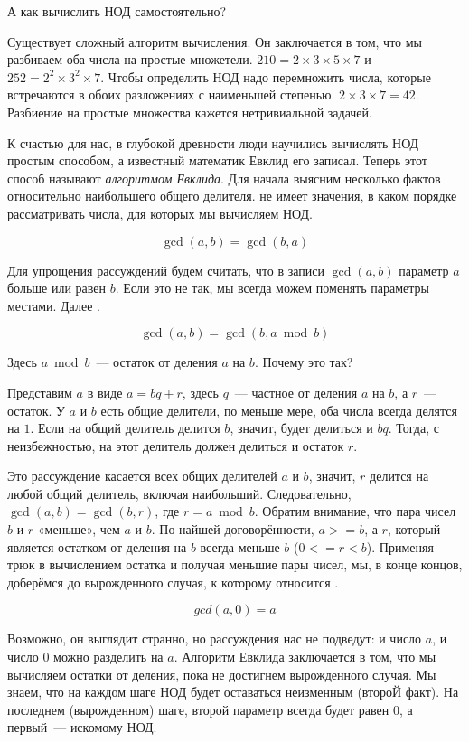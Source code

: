 А как вычислить НОД самостоятельно?

Существует сложный алгоритм вычисления.
Он заключается в том, что мы разбиваем оба числа на простые множетели.
$210 = 2 \times 3 \times 5 \times 7$ и $252 = 2^2 \times 3^2 \times 7$.
Чтобы определить НОД надо перемножить числа, которые встречаются в обоих разложениях с наименьшей степенью.
$2 \times 3 \times 7 = 42$.
Разбиение на простые множества кажется нетривиальной задачей.

К счастью для нас, в глубокой древности люди научились вычислять НОД простым способом, а известный математик Евклид его записал.
Теперь этот способ называют {\em алгоритмом Евклида}.
Для начала выясним несколько фактов относительно наибольшего общего делителя.
 не имеет значения, в каком порядке рассматривать числа, для которых мы вычисляем НОД.

$$
\gcd(a, b) = \gcd(b, a)
$$

Для упрощения рассуждений будем считать, что в записи $\gcd(a, b)$ параметр $a$ больше или равен $b$.
Если это не так, мы всегда можем поменять параметры местами.
Далее .

$$
\gcd(a, b) = \gcd(b, a \bmod b)
$$

Здесь $a \bmod b$~--- остаток от деления $a$ на $b$.
Почему это так?

Представим $a$ в виде $a = b q + r$, здесь $q$~--- частное от деления $a$ на $b$, а $r$~--- остаток.
У $a$ и $b$ есть общие делители, по меньше мере, оба числа всегда делятся на $1$.
Если на общий делитель делится $b$, значит, будет делиться и $b q$.
Тогда, с неизбежностью, на этот делитель должен делиться и остаток $r$.

Это рассуждение касается всех общих делителей $a$ и $b$, значит, $r$ делится на любой общий делитель, включая наибольший.
Следовательно, $\gcd(a, b) = \gcd(b, r)$, где $r = a \bmod b$.
Обратим внимание, что пара чисел $b$ и $r$ «меньше», чем $a$ и $b$.
По найшей договорённости, $a >= b$, а $r$, который является остатком от деления на $b$ всегда меньше $b$ ($0 <= r < b$).
Применяя трюк в вычислением остатка и получая меньшие пары чисел, мы, в конце концов, доберёмся до вырожденного случая, к которому относится .

$$
gcd(a, 0) = a
$$

Возможно, он выглядит странно, но рассуждения нас не подведут: и число $a$, и число $0$ можно разделить на $a$.
Алгоритм Евклида заключается в том, что мы вычисляем остатки от деления, пока не достигнем вырожденного случая.
Мы знаем, что на каждом шаге НОД будет оставаться неизменным (второЙ факт).
На последнем (вырожденном) шаге, второй параметр всегда будет равен $0$, а первый~--- искомому НОД.

